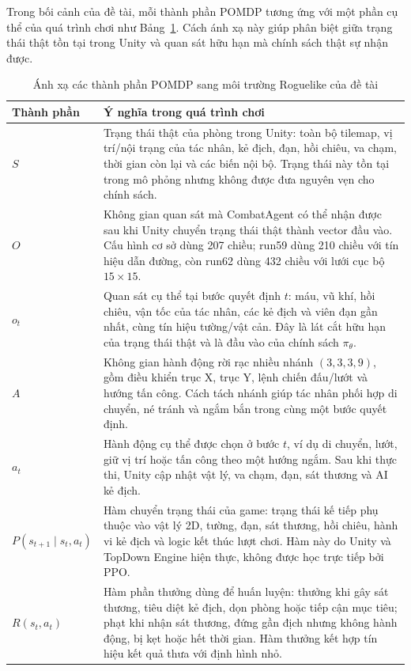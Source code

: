 Trong bối cảnh của đề tài, mỗi thành phần POMDP tương ứng với một phần cụ thể của quá trình chơi như Bảng~\ref{tab:pomdp_mapping}. Cách ánh xạ này giúp phân biệt giữa trạng thái thật tồn tại trong Unity và quan sát hữu hạn mà chính sách thật sự nhận được.

\begin{table}[H]
    \centering
    \small
    \caption{Ánh xạ các thành phần POMDP sang môi trường Roguelike của đề tài}
    \label{tab:pomdp_mapping}
    \begin{tabular}{|p{2.7cm}|p{11.5cm}|}
        \hline
        \textbf{Thành phần} & \textbf{Ý nghĩa trong quá trình chơi} \\
        \hline
        $S$ & Trạng thái thật của phòng trong Unity: toàn bộ tilemap, vị trí/nội trạng của tác nhân, kẻ địch, đạn, hồi chiêu, va chạm, thời gian còn lại và các biến nội bộ. Trạng thái này tồn tại trong mô phỏng nhưng không được đưa nguyên vẹn cho chính sách. \\
        \hline
        $O$ & Không gian quan sát mà CombatAgent có thể nhận được sau khi Unity chuyển trạng thái thật thành vector đầu vào. Cấu hình cơ sở dùng 207 chiều; run59 dùng 210 chiều với tín hiệu dẫn đường, còn run62 dùng 432 chiều với lưới cục bộ $15\times15$. \\
        \hline
        $o_t$ & Quan sát cụ thể tại bước quyết định $t$: máu, vũ khí, hồi chiêu, vận tốc của tác nhân, các kẻ địch và viên đạn gần nhất, cùng tín hiệu tường/vật cản. Đây là lát cắt hữu hạn của trạng thái thật và là đầu vào của chính sách $\pi_\theta$. \\
        \hline
        $A$ & Không gian hành động rời rạc nhiều nhánh $(3,3,3,9)$, gồm điều khiển trục X, trục Y, lệnh chiến đấu/lướt và hướng tấn công. Cách tách nhánh giúp tác nhân phối hợp di chuyển, né tránh và ngắm bắn trong cùng một bước quyết định. \\
        \hline
        $a_t$ & Hành động cụ thể được chọn ở bước $t$, ví dụ di chuyển, lướt, giữ vị trí hoặc tấn công theo một hướng ngắm. Sau khi thực thi, Unity cập nhật vật lý, va chạm, đạn, sát thương và AI kẻ địch. \\
        \hline
        $P(s_{t+1}\mid s_t,a_t)$ & Hàm chuyển trạng thái của game: trạng thái kế tiếp phụ thuộc vào vật lý 2D, tường, đạn, sát thương, hồi chiêu, hành vi kẻ địch và logic kết thúc lượt chơi. Hàm này do Unity và TopDown Engine hiện thực, không được học trực tiếp bởi PPO. \\
        \hline
        $R(s_t,a_t)$ & Hàm phần thưởng dùng để huấn luyện: thưởng khi gây sát thương, tiêu diệt kẻ địch, dọn phòng hoặc tiếp cận mục tiêu; phạt khi nhận sát thương, đứng gần địch nhưng không hành động, bị kẹt hoặc hết thời gian. Hàm thưởng kết hợp tín hiệu kết quả thưa với định hình nhỏ. \\

\end{tabular}
\end{table}
